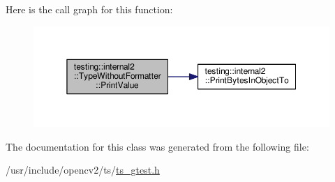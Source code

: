 Here is the call graph for this function\-:\nopagebreak
\begin{figure}[H]
\begin{center}
\leavevmode
\includegraphics[width=350pt]{classtesting_1_1internal2_1_1TypeWithoutFormatter_a6c377c9580fce3a0226911417053f417_cgraph}
\end{center}
\end{figure}




The documentation for this class was generated from the following file\-:\begin{DoxyCompactItemize}
\item 
/usr/include/opencv2/ts/\hyperlink{ts__gtest_8h}{ts\-\_\-gtest.\-h}\end{DoxyCompactItemize}
